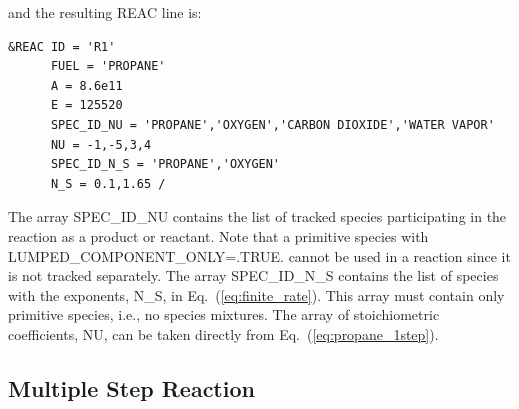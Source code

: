 \documentclass[11pt]{book}
\begin{document}
and the resulting {\ct REAC} line is:
\begin{lstlisting}
&REAC ID = 'R1'
      FUEL = 'PROPANE'
      A = 8.6e11
      E = 125520
      SPEC_ID_NU = 'PROPANE','OXYGEN','CARBON DIOXIDE','WATER VAPOR'
      NU = -1,-5,3,4
      SPEC_ID_N_S = 'PROPANE','OXYGEN'
      N_S = 0.1,1.65 /
\end{lstlisting}
The array {\ct SPEC\_ID\_NU} contains the list of tracked species participating in the reaction as a product or reactant.  Note that a primitive species with {\ct LUMPED\_COMPONENT\_ONLY=.TRUE.} cannot be used in a reaction since it is not tracked separately.  The array {\ct SPEC\_ID\_N\_S} contains the list of species with the exponents, {\ct N\_S}, in Eq.~(\ref{eq:finite_rate}).  This array must contain only primitive species, i.e., no species mixtures. The array of stoichiometric coefficients, {\ct NU}, can be taken directly from Eq.~(\ref{eq:propane_1step}).

\subsection{Multiple Step Reaction}
\end{document}
